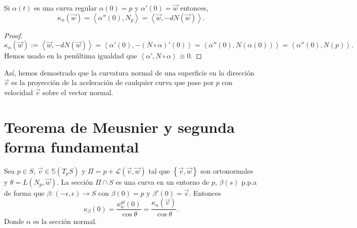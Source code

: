 \begin{prop}
Si $\displaystyle \alpha\left(t\right) $ es una curva regular $\displaystyle \alpha\left(0\right)=p $ y $\displaystyle \alpha'\left(0\right)=\vec{w} $ entonces, 
\[\kappa_{n}\left(\vec{w}\right) = \left\langle \alpha''\left(0\right), N_{p} \right\rangle =\left\langle \vec{w},-dN\left(\vec{w}\right) \right\rangle  .\]
\end{prop}
\begin{proof}
\[\kappa_{n}\left(\vec{w}\right):=\left\langle \vec{w}, -dN\left(\vec{w}\right) \right\rangle =\left\langle \alpha'\left(0\right), -\left(N\circ \alpha \right)'\left(0\right) \right\rangle =\left\langle \alpha''\left(0\right), N\left(\alpha\left(0\right)\right) \right\rangle =\left\langle \alpha''\left(0\right), N\left(p\right) \right\rangle  .\]
Hemos usado en la penúltima igualdad que $\displaystyle \left\langle \alpha', N\circ \alpha  \right\rangle \equiv 0 $.
\end{proof}
\begin{observation}
Así, hemos demostrado que la curvatura normal de una superficie en la dirección $\displaystyle \vec{v} $ es la proyección de la aceleración de caulquier curva que pase por $\displaystyle p $ con velocidad $\displaystyle \vec{v} $ sobre el vector normal. 
\end{observation}

\section{Teorema de Meusnier y segunda forma fundamental}
\begin{theorem}
	Sea $\displaystyle p \in S $, $\displaystyle \vec{v}\in  \mathbb{S}\left(T_{p}S\right) $ y $\displaystyle \Pi = p + \mathcal{L}\left(\vec{v}, \vec{w}\right) $ tal que $\displaystyle \left\{ \vec{v}, \vec{w}\right\}  $ son ortonormales y $\displaystyle \theta = L\left(N_{p}, \vec{w}\right) $. La sección $\displaystyle \Pi \cap S $ es una curva en un entorno de $\displaystyle p $, $\displaystyle \beta\left(s\right) $ p.p.a de forma que $\displaystyle \beta : \left(-\epsilon , \epsilon \right)\to S $ con $\displaystyle \beta\left(0\right)=p $ y $\displaystyle \beta'\left(0\right)=\vec{v} $.
	Entonces
	\[\kappa_{\beta }\left(0\right)=\frac{\kappa_{\alpha }^{pl}\left(0\right)}{\cos \theta} = \frac{\kappa_{n}\left(\vec{v}\right)}{\cos \theta } .\]	
	Donde $\displaystyle \alpha  $ es la sección normal.
\end{theorem}


